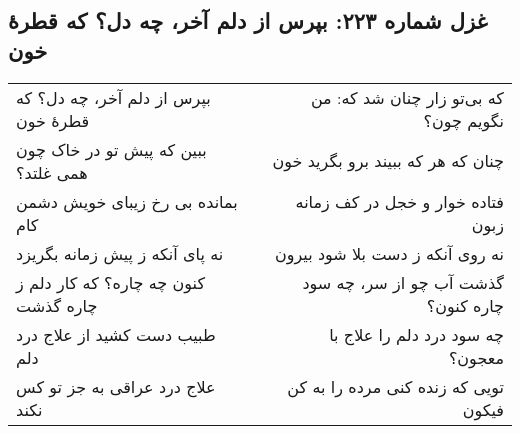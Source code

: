 \begin{center}
\section*{غزل شماره ۲۲۳: بپرس از دلم آخر، چه دل؟ که قطرهٔ خون}
\label{sec:223}
\begin{longtable}{l p{0.5cm} r}
بپرس از دلم آخر، چه دل؟ که قطرهٔ خون
&&
که بی‌تو زار چنان شد که: من نگویم چون؟
\\
ببین که پیش تو در خاک چون همی غلتد؟
&&
چنان که هر که ببیند برو بگرید خون
\\
بمانده بی رخ زیبای خویش دشمن کام
&&
فتاده خوار و خجل در کف زمانه زبون
\\
نه پای آنکه ز پیش زمانه بگریزد
&&
نه روی آنکه ز دست بلا شود بیرون
\\
کنون چه چاره؟ که کار دلم ز چاره گذشت
&&
گذشت آب چو از سر، چه سود چاره کنون؟
\\
طبیب دست کشید از علاج درد دلم
&&
چه سود درد دلم را علاج با معجون؟
\\
علاج درد عراقی به جز تو کس نکند
&&
تویی که زنده کنی مرده را به کن فیکون
\\
\end{longtable}
\end{center}

